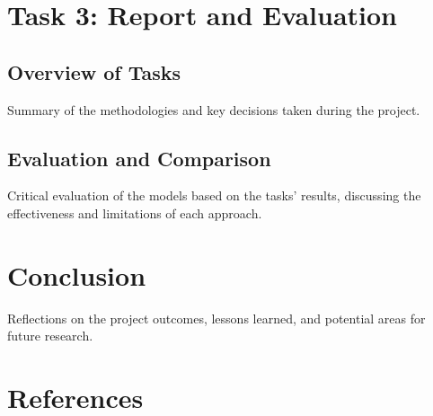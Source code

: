 \documentclass[12pt]{article} \usepackage{COSC420style} \usepackage{soul}
\begin{document}
\section{Task 3: Report and Evaluation}

\subsection{Overview of Tasks}

Summary of the methodologies and key decisions taken during the project.

\subsection{Evaluation and Comparison}

Critical evaluation of the models based on the tasks' results, discussing the effectiveness and
limitations of each approach.

\section{Conclusion}

Reflections on the project outcomes, lessons learned, and potential areas for future research.

\section{References}
\end{document}
